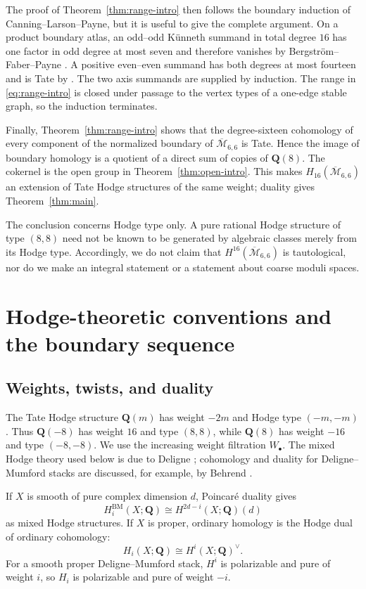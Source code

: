 \documentclass[12pt,reqno]{amsart}
\newcommand{\Q}{\mathbf{Q}}
\newcommand{\Mbar}{\overline{\mathcal{M}}}
\newcommand{\BM}{\mathrm{BM}}
\theoremstyle{definition}
\theoremstyle{remark}
\begin{document}
The proof of Theorem~\ref{thm:range-intro} then follows the boundary induction
of Canning--Larson--Payne, but it is useful to give the complete argument.
On a product boundary atlas, an odd--odd K\"unneth summand in total degree
$16$ has one factor in odd degree at most seven and therefore vanishes by
Bergstr\"om--Faber--Payne \cite{BFP}.  A positive even--even summand has both
degrees at most fourteen and is Tate by \cite[Theorem~1.5(3)]{CLP}.  The two
axis summands are supplied by induction.  The range in
\eqref{eq:range-intro} is closed under passage to the vertex types of a
one-edge stable graph, so the induction terminates.

Finally, Theorem~\ref{thm:range-intro} shows that the degree-sixteen
cohomology of every component of the normalized boundary of
$\Mbar_{6,6}$ is Tate.  Hence the image of boundary homology is a quotient of
a direct sum of copies of $\Q(8)$.  The cokernel is the open group in
Theorem~\ref{thm:open-intro}.  This makes $H_{16}(\Mbar_{6,6})$ an extension
of Tate Hodge structures of the same weight; duality gives
Theorem~\ref{thm:main}.

The conclusion concerns Hodge type only.  A pure rational Hodge structure of
type $(8,8)$ need not be known to be generated by algebraic classes merely
from its Hodge type.  Accordingly, we do not claim that
$H^{16}(\Mbar_{6,6})$ is tautological, nor do we make an integral statement
or a statement about coarse moduli spaces.

\section{Hodge-theoretic conventions and the boundary sequence}

\subsection{Weights, twists, and duality}

The Tate Hodge structure $\Q(m)$ has weight $-2m$ and Hodge type
$(-m,-m)$.  Thus $\Q(-8)$ has weight $16$ and type $(8,8)$, while
$\Q(8)$ has weight $-16$ and type $(-8,-8)$.  We use the increasing weight
filtration $W_\bullet$.  The mixed Hodge theory used below is due to Deligne
\cite{DeligneHodgeII,DeligneHodgeIII}; cohomology and duality for
Deligne--Mumford stacks are discussed, for example, by Behrend
\cite{BehrendStacks}.

If $X$ is smooth of pure complex dimension $d$, Poincar\'e duality gives
\begin{equation}\label{eq:pd-smooth}
 H_i^{\BM}(X;\Q)\cong H^{2d-i}(X;\Q)(d)
\end{equation}
as mixed Hodge structures.  If $X$ is proper, ordinary homology is the Hodge
dual of ordinary cohomology:
\begin{equation}\label{eq:proper-dual}
  H_i(X;\Q)\cong H^i(X;\Q)^\vee.
\end{equation}
For a smooth proper Deligne--Mumford stack, $H^i$ is polarizable and pure of
weight $i$, so $H_i$ is polarizable and pure of weight $-i$.
\end{document}
